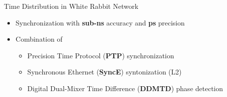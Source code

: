 \documentclass[compress,red]{beamer}
\begin{document}
\begin{frame}{Time Distribution in White Rabbit Network}

  \begin{itemize}
    \item Synchronization with {\bf sub-ns} accuracy and {\bf ps} precision
    \item Combination of
	\begin{itemize}
	  \item Precision Time Protocol ({\bf PTP}) synchronization
	  \item Synchronous Ethernet ({\bf SyncE}) syntonization (L2)
	  \item Digital Dual-Mixer Time Difference ({\bf DDMTD}) phase detection
	\end{itemize}
  \end{itemize}
\end{frame}
\end{document}
